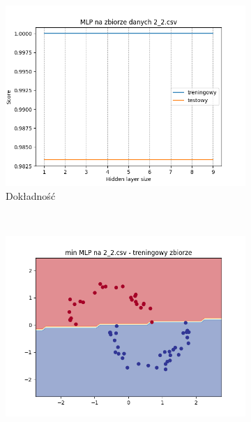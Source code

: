 \documentclass[12pt]{article}
\newcommand*{\subfigwidth}{0.24\textwidth}
\begin{document}
\begin{figure}[H]\centering
    \begin{subfigure}[t]{\subfigwidth}
        \includegraphics[width=\linewidth]{img/exp_3/mlp/2_2/accuracy.png}
        \caption{Dokładność}
    \end{subfigure}
    \\
    \begin{subfigure}[t]{\subfigwidth}
        \includegraphics[width=\linewidth]{img/exp_3/mlp/2_2/min/train_boundary.png}

\end{subfigure}
\end{figure}
\end{document}
